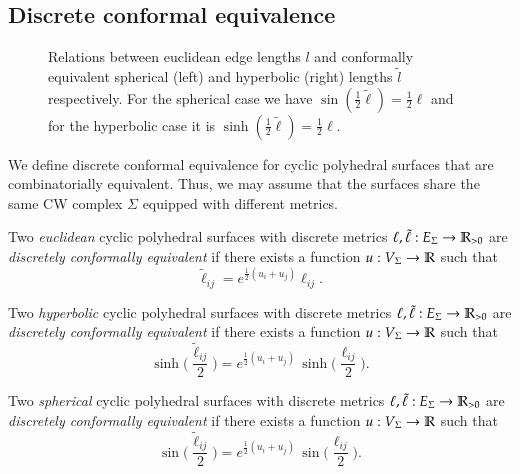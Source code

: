\documentclass[Thesis]{subfiles}
\begin{document}
\subsection{Discrete conformal equivalence}
\label{sec:discr-conf-equiv}

\begin{figure}
\centering
\resizebox{0.6\textwidth}{!}{


}
\caption{
Relations between euclidean edge lengths $l$ and conformally equivalent spherical (left) and hyperbolic (right) lengths $\tilde l$ respectively. 
For the spherical case we have $\sin(\frac{1}{2}\tilde \ell)=\frac{1}{2}\ell$ and for the hyperbolic case it is $\sinh(\frac{1}{2}\tilde \ell)=\frac{1}{2}\ell$.
}
\label{fig:geometries}
\end{figure}


We define discrete conformal equivalence for cyclic polyhedral
surfaces that are combinatorially equivalent. Thus, we may assume that
the surfaces share the same CW complex $\Sigma$ equipped with
different metrics.

Two \emph{euclidean} cyclic polyhedral surfaces with
discrete metrics $\ell,\tilde\ell:E_{\Sigma}\rightarrow\mathbb R_{>0}$ are
\emph{discretely conformally equivalent} if there exists a function
$u:V_{\Sigma}\rightarrow\mathbb R$ such that
\begin{equation}
\label{eq:tilde_ell_euc}
\tilde\ell_\mathit{ij}=e^{\frac{1}{2}(u_{i}+u_{j})}\ell_\mathit{ij}.
\end{equation}

Two \emph{hyperbolic} cyclic polyhedral surfaces with
discrete metrics $\ell,\tilde\ell:E_{\Sigma}\rightarrow\mathbb R_{>0}$ are
\emph{discretely conformally equivalent} if there exists a function
$u:V_{\Sigma}\rightarrow\mathbb R$ such that
\begin{equation}
\label{eq:tilde_ell_hyp}
\sinh\Big(\frac{\tilde\ell_\mathit{ij}}{2}\Big)
= e^{\frac{1}{2}(u_{i}+u_{j})}\,
\sinh\Big(\frac{\ell_\mathit{ij}}{2}\Big).
\end{equation}


Two \emph{spherical} cyclic polyhedral surfaces with
discrete metrics $\ell,\tilde\ell:E_{\Sigma}\rightarrow\mathbb R_{>0}$ are
\emph{discretely conformally equivalent} if there exists a function
$u:V_{\Sigma}\rightarrow\mathbb R$ such that
\begin{equation}
\label{eq:tilde_ell_sph}
\sin\Big(\frac{\tilde\ell_\mathit{ij}}{2}\Big)
= e^{\frac{1}{2}(u_{i}+u_{j})}\,
\sin\Big(\frac{\ell_\mathit{ij}}{2}\Big).
\end{equation}
\end{document}
